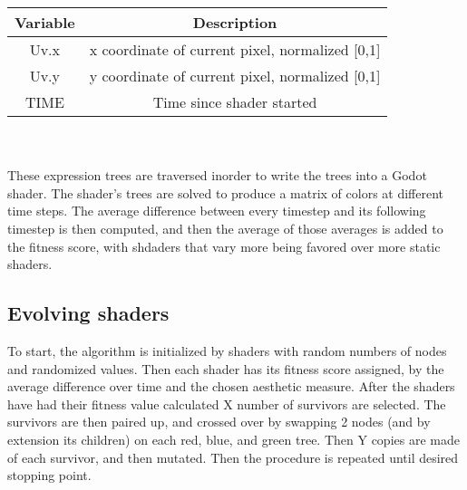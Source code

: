 \documentclass{article}
\begin{document}
\begin{tabular}{|c|c|}
    \hline
    Variable & Description \\ 
    \hline
    Uv.x & x coordinate of current pixel, normalized [0,1]\\
    \hline
    Uv.y & y coordinate of current pixel, normalized [0,1]\\
    \hline
    TIME & Time since shader started\\
    \hline
\end{tabular}\\\\
These expression trees are traversed inorder to write the trees into a Godot shader. The shader's trees are solved to produce a matrix of colors at different time steps. The average difference between every timestep and its following timestep is then computed,
and then the average of those averages is added to the fitness score, with shdaders that vary more being favored over more static shaders.
\subsection*{Evolving shaders}
To start, the algorithm is initialized by shaders with random numbers of nodes and randomized values. Then each shader has its fitness score assigned, by the average difference over time and the chosen aesthetic measure. 
After the shaders have had their fitness value calculated X number of survivors are selected. The survivors are then paired up, and crossed over by swapping 2 nodes (and by extension its children) on each red, blue, and green
tree. Then Y copies are made of each survivor, and then mutated. Then the procedure is repeated until desired stopping point.
\end{document}
